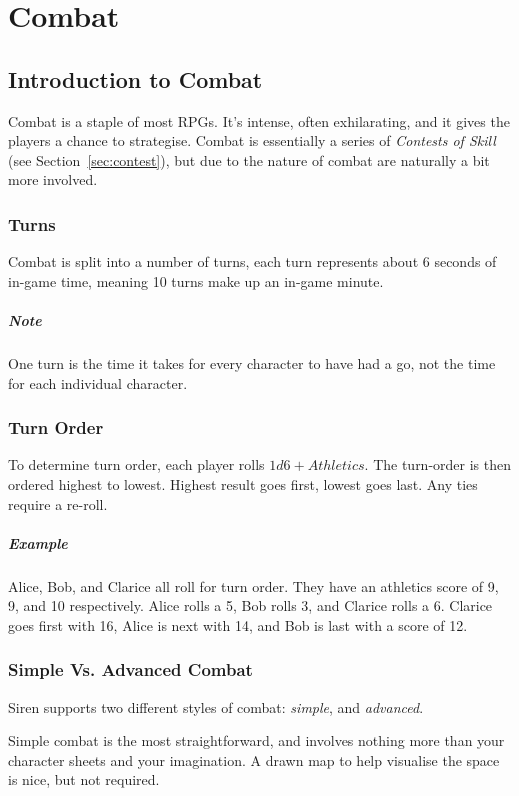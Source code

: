 \chapter{Combat}
\section{Introduction to Combat}
Combat is a staple of most RPGs. 
It's intense, often exhilarating, and it gives the players a chance to strategise.
Combat is essentially a series of \textit{Contests of Skill} (see Section~\ref{sec:contest}), but due to the nature of combat are naturally a bit more involved.
\subsection{Turns}
Combat is split into a number of turns, each turn represents about 6 seconds of in-game time, meaning 10 turns make up an in-game minute.

\paragraph{Note} One turn is the time it takes for every character to have had a go, not the time for each individual character.
\subsection{Turn Order}
To determine turn order, each player rolls $1d6+Athletics$. The turn-order is then ordered highest to lowest. Highest result goes first, lowest goes last. Any ties require a re-roll.

\paragraph{Example} Alice, Bob, and Clarice all roll for turn order. They have an athletics score of 9, 9, and 10 respectively. Alice rolls a 5, Bob rolls 3, and Clarice rolls a 6. Clarice goes first with 16, Alice is next with 14, and Bob is last with a score of 12.

\subsection{Simple Vs. Advanced Combat}
Siren supports two different styles of combat: \textit{simple}, and \textit{advanced}.

Simple combat is the most straightforward, and involves nothing more than your character sheets and your imagination. A drawn map to help visualise the space is nice, but not required.

